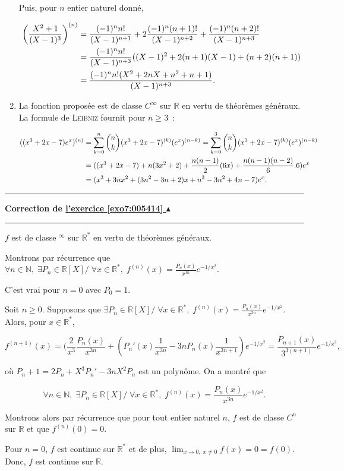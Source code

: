 \documentclass[11pt,a4paper]{article}
\newcommand{\Nn}{\mathbb{N}} \newcommand{\N}{\mathbb{N}}
\newcommand{\Rr}{\mathbb{R}} \newcommand{\R}{\mathbb{R}}
\newcounter{exo}
\newcommand{\correction}[1]{\hypertarget{cor7:#1}{}\label{cor7:#1}{\bf Correction de \hyperlink{exo7:#1}{l'exercice \ref{exo7:#1} $\blacktriangle$}}\vspace{1mm}\hrule\vspace{1mm}}
\newcommand{\fincorrection}{\vspace{1mm}\hrule\vspace*{7mm}}
\begin{document}
\begin{enumerate}
Puis, pour $n$ entier naturel donné,

\begin{align*}\ensuremath
\left(\frac{X^2+1}{(X-1)^3}\right)^{(n)}&=\frac{(-1)^nn!}{(X-1)^{n+1}}+2\frac{(-1)^n(n+1)!}{(X-1)^{n+2}}+\frac{(-1)^n(n+2)!}{(X-1)^{n+3}}\\
 &=\frac{(-1)^nn!}{(X-1)^{n+3}}((X-1)^2+2(n+1)(X-1)+(n+2)(n+1))\\
 &=\frac{(-1)^nn!(X^2+2nX+n^2+n+1)}{(X-1)^{n+3}}.
\end{align*}

\item  La fonction proposée est de classe $C^\infty$ sur $\Rr$ en vertu de théorèmes généraux. La formule de \textsc{Leibniz} fournit pour $n\geq3$~:

\begin{align*}\ensuremath
((x^3+2x-7)e^x)^{(n)}&=\sum_{k=0}^{n}\dbinom{n}{k}(x^3+2x-7)^{(k)}(e^x)^{(n-k)}=\sum_{k=0}^{3}\dbinom{n}{k}(x^3+2x-7)^{(k)}(e^x)^{(n-k)}\\
 &=((x^3+2x-7)+n(3x^2+2)+\frac{n(n-1)}{2}(6x)+\frac{n(n-1)(n-2)}{6}.6)e^x\\
 &=(x^3+3nx^2+(3n^2-3n+2)x+n^3-3n^2+4n-7)e^x.
\end{align*}
\end{enumerate}
\fincorrection
\correction{005414}
$f$ est de classe $ ^\infty$ sur $\Rr^*$ en vertu de théorèmes généraux.

Montrons par récurrence que $\forall n\in\Nn,\;\exists P_n\in\Rr[X]/\;\forall x\in\Rr^*,\;f^{(n)}(x)=\frac{P_n(x)}{x^{3n}}e^{-1/x^2}$.

C'est vrai pour $n=0$ avec $P_0=1$.

Soit $n\geq0$. Supposons que $\exists P_n\in\Rr[X]/\;\forall x\in\Rr^*,\;f^{(n)}(x)=\frac{P_n(x)}{x^{3n}}e^{-1/x^2}$. Alors, pour $x\in\Rr^*$,

$$f^{(n+1)}(x)=(\frac{2}{x^3}\frac{P_n(x)}{x^{3n}}+(P_n'(x)\frac{1}{x^{3n}}-3nP_n(x)\frac{1}{x^{3n+1}})e^{-1/x^2}
=\frac{P_{n+1}(x)}{3^{3(n+1)}}e^{-1/x^2},$$

où $P_n+1=2P_n+X^3P_n'-3nX^2P_n$ est un polynôme. On a montré que 

$$\forall n\in\Nn,\;\exists P_n\in\Rr[X]/\;\forall x\in\Rr^*,\;f^{(n)}(x)=\frac{P_n(x)}{x^{3n}}e^{-1/x^2}.$$

Montrons alors par récurrence que pour tout entier naturel $n$, $f$ est de classe $C^n$ sur $\Rr$ et que $f^{(n)}(0)=0$.

Pour $n=0$, $f$ est continue sur $\Rr^*$ et de plus, $\lim_{x\rightarrow 0,\;x\neq0}f(x)=0=f(0)$. Donc, $f$ est continue sur $\Rr$.
\end{document}
